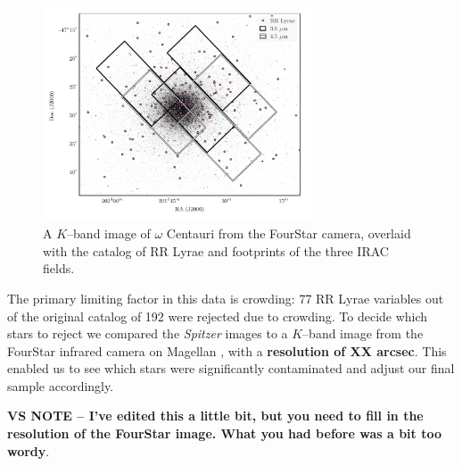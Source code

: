 \documentclass[a4paper,fleqn,usenatbib]{mnras}
\begin{document}
\begin{figure}
\begin{center}
\includegraphics[width=80mm]{final_plots/omegacen_coverage_map.pdf}
\caption{A $K$--band image of $\omega$ Centauri from the FourStar camera, overlaid with the catalog of RR Lyrae \citep{2004A&A...424.1101K} and footprints of the three IRAC fields.}
\label{fig:omegaCen_fields}
\end{center}
\end{figure}



The primary limiting factor in this data is crowding: 77 RR Lyrae variables out of the original catalog of 192 \citet{2004A&A...424.1101K} were rejected due to crowding. To decide which stars to reject we compared the {\it Spitzer} images to a $K$--band image from the FourStar infrared camera on Magellan \citep{2013PASP..125..654P}, with a {\bf resolution of XX arcsec}. This enabled us to see which stars were significantly contaminated and adjust our final sample accordingly. 

{\bf VS NOTE -- I've edited this a little bit, but you need to fill in the resolution of the FourStar image. What you had before was a bit too wordy}. 
\end{document}
